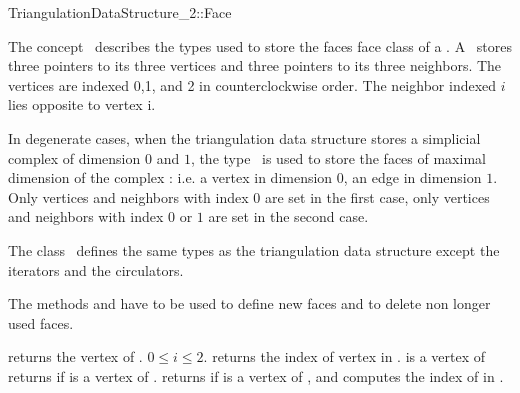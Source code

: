 

\begin{ccRefConcept}{TriangulationDataStructure_2::Face}


\ccDefinition
  
The concept \ccRefName\  describes the types used to store the faces
face class of a 
.
A \ccRefName\ stores three pointers to its three vertices
and three pointers to its three neighbors.
The vertices are indexed 0,1, and 2 in counterclockwise order.
The  neighbor indexed $i$ lies
opposite to vertex i.

In degenerate cases,
when the triangulation data structure  stores a
simplicial complex of dimension $0$ and $1$,
the type \ccRefName\  is used to store the faces 
of maximal dimension of the complex 
: i.e. a vertex in dimension $0$, an edge in dimension $1$.
Only vertices and neighbors with index $0$ are set in the first case,
only vertices and neighbors with index $0$ or $1$ are set in the second case.


\ccTypes
The class \ccRefName\ defines the same types as 
the triangulation data structure 
except the iterators and the circulators.


\ccCreation

The methods  and
have to be used to 
define new faces and  to delete non longer used faces.



{returns  the vertex  of \ccVar.
\ccPrecond $0\leq i \leq 2$.}
\ccGlue
{}
{returns the index of vertex  in \ccVar. \ccPrecond {} is
a vertex of \ccVar}
\ccGlue
{}
{returns  if   is a vertex of \ccVar.}
\ccGlue
{}
{returns  if   is a vertex of \ccVar, and
 computes the index  of  in .}



\end{ccRefConcept}
